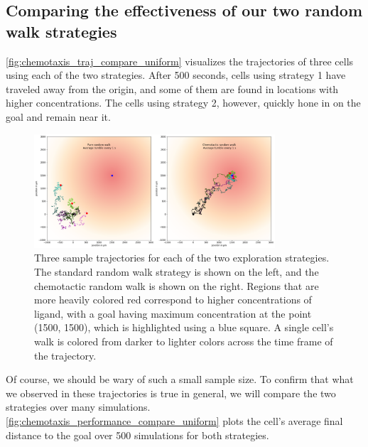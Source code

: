 \subsection{Comparing the effectiveness of our two random walk strategies}

\autoref{fig:chemotaxis_traj_compare_uniform} visualizes the trajectories of three cells using each of the two strategies. After 500 seconds, cells using strategy 1 have traveled away from the origin, and some of them are found in locations with higher concentrations. The cells using strategy 2, however, quickly hone in on the goal and remain near it.

\begin{figure}[h]
\centering
\mySfFamily
\includegraphics[width = 0.8\textwidth]{../images/chemotaxis_traj_compare_uniform.png}
\caption{Three sample trajectories for each of the two exploration strategies. The standard random walk strategy is shown on the left, and the chemotactic random walk is shown on the right. Regions that are more heavily colored red correspond to higher concentrations of ligand, with a goal having maximum concentration at the point (1500, 1500), which is highlighted using a blue square. A single cell's walk is colored from darker to lighter colors across the time frame of the trajectory.}
\label{fig:chemotaxis_traj_compare_uniform}
\end{figure}


Of course, we should be wary of such a small sample size. To confirm that what we observed in these trajectories is true in general, we will compare the two strategies over many simulations. \autoref{fig:chemotaxis_performance_compare_uniform} plots the cell's average final distance to the goal over 500 simulations for both strategies.

